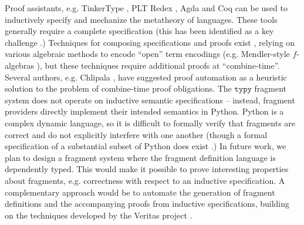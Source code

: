 \documentclass[preprint,10pt]{sigplanconf}
\newcommand{\typy}{\texttt{typy}}
\begin{document}
Proof assistants, e.g. TinkerType \cite{LevinPierce99}, PLT Redex \cite{Felleisen-Findler-Flatt09}, Agda \cite{norell2007towards} and Coq \cite{Coq:manual} can be used to inductively specify and mechanize the metatheory of languages. These tools generally require a complete specification (this  has been identified as a key challenge \cite{aydemir05tphols}.) Techniques for composing specifications and proofs exist \cite{conf/popl/DelawareOS13,Delaware11,conf/plpv/SchwaabS13}, relying on various algebraic methods to encode ``open'' term encodings (e.g. Mendler-style $f$-algebras \cite{conf/popl/DelawareOS13}), but these techniques  require additional proofs at ``combine-time''. %
Several authors, e.g. Chlipala  \cite{Chlipala10}, have suggested  proof automation as a heuristic solution to the problem of combine-time proof obligations. The $\typy$ fragment system does not operate on inductive semantic specifications -- instead, fragment providers directly implement their intended semantics in Python. Python is a complex dynamic language, so it is difficult to formally verify that fragments are correct and do not explicitly  interfere with one another (though a formal specification of a substantial subset of Python does exist \cite{politz2013python}.) In future work, we plan to design a fragment system where the fragment definition language is dependently typed. This would make it possible to prove interesting properties about fragments, e.g. correctness with respect to an inductive specification. A complementary approach would be to automate the generation of fragment definitions and the accompanying proofs from inductive specifications, building on the techniques developed by the Veritas project \cite{grewe2015type}.
\end{document}
